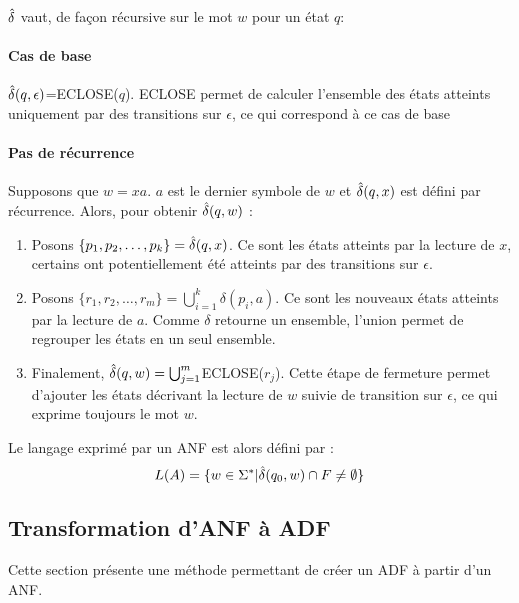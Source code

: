 $\hat{\delta}$ vaut, de façon récursive sur le mot $w$ pour un état $q$:

\paragraph{Cas de base} $\hat{\delta}(q,\epsilon)$=ECLOSE($q$). ECLOSE permet de calculer l'ensemble des états atteints uniquement par des transitions sur $\epsilon$, ce qui correspond à ce cas de base

\paragraph{Pas de récurrence} Supposons que $w=xa$. $a$ est le dernier symbole de $w$ et $\hat{\delta}(q,x)$ est défini par récurrence. Alors, pour obtenir $\hat{\delta}(q,w)$ :
\begin{enumerate}
	\item Posons $\{p_1,p_2,\dots, p_k\}=\hat{\delta}(q,x)$. Ce sont les états atteints par la lecture de $x$, certains ont potentiellement été atteints par des transitions sur $\epsilon$.
	\item Posons $\{r_1,r_2,\dots, r_m\} = \bigcup_{i=1}^k\delta(p_i, a)$. Ce sont les nouveaux états atteints par la lecture de $a$. Comme $\delta$ retourne un ensemble, l'union permet de regrouper les états en un seul ensemble.
	\item Finalement, $\hat{\delta}(q,w)=\bigcup_{j=1}^m$ECLOSE($r_j$). Cette étape de fermeture permet d'ajouter les états décrivant la lecture de $w$ suivie de transition sur $\epsilon$, ce qui exprime toujours le mot $w$. 
\end{enumerate}


Le langage exprimé par un ANF \automaton est alors défini par :
$$
	L(A) = \{w \in \Sigma^*| \hat{\delta}(q_0, w) \cap F \neq \emptyset\}
$$

\subsection{Transformation d'ANF à ADF}\label{ss:eanfadf}

Cette section présente une méthode permettant de créer un ADF à partir d'un ANF. 

